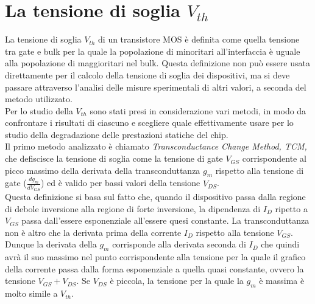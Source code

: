 \documentclass[12pt, letterpaper]{book}
\begin{document}
\chapter{La tensione di soglia $V_{th}$}

La tensione di soglia $V_{th}$ di un transistore MOS è definita come quella tensione tra gate e bulk per la quale la popolazione di minoritari all’interfaccia è uguale alla popolazione di maggioritari nel bulk. Questa definizione non può essere usata direttamente per il calcolo della tensione di soglia dei dispositivi, ma si deve passare attraverso l'analisi delle misure sperimentali di altri valori, a seconda del metodo utilizzato. \\	
Per lo studio della $V_{th}$ sono stati presi in considerazione vari metodi, in modo da confrontare i risultati di ciascuno e scegliere quale effettivamente usare per lo studio della degradazione delle prestazioni statiche del chip.\\

Il primo metodo analizzato è chiamato \emph{Transconductance Change Method, TCM,} che defiscisce la tensione di soglia come la tensione di gate $V_{GS}$ corrispondente al picco massimo della derivata della transconduttanza $g_m$ rispetto alla tensione di gate ($\frac{dg_m}{dV_ {GS}}$) ed è valido per bassi valori della tensione $V_{DS}$.\\
Questa definizione si basa sul fatto che, quando il dispositivo passa dalla regione di debole inversione alla regione di forte inversione, la dipendenza di $I_D$ ripetto a $V_{GS}$ passa dall'essere esponenziale all'essere quesi constante. 
La transconduttanza non è altro che la derivata prima della corrente $I_D$ rispetto alla tensione $V_{GS}$. Dunque la derivata della $g_m$ corrisponde alla derivata seconda di $I_D$ che quindi avrà il suo massimo nel punto corrispondente alla tensione per la quale il grafico della corrente passa dalla forma esponenziale a quella quasi constante, ovvero la tensione $V_{GS}+V_{DS}$. Se $V_{DS}$ è piccola, la tensione per la quale la $g_m$ è massima è molto simile a $V_{th}$.\\
\end{document}
